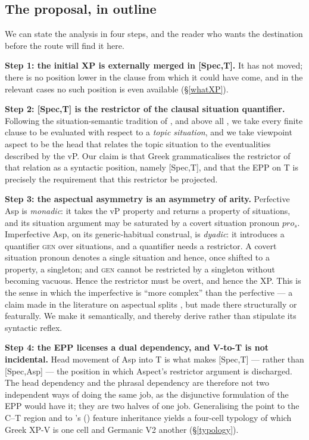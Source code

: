 \documentclass[11pt]{article}
\newcommand{\citeposs}[1]{\citeauthor{#1}'s (\citeyear{#1})}
\newcommand{\gen}{\textsc{gen}\xspace}
\newcommand{\prs}{\ensuremath{pro_{s}}\xspace}
\begin{document}
\subsection{The proposal, in outline}

We can state the analysis in four steps, and the reader who wants the destination before the route will find it here.

\medskip\noindent\textbf{Step 1: the initial XP is externally merged in [Spec,T].}  It has not moved; there is no position lower in the clause from which it could have come, and in the relevant cases no such position is even available (\S\ref{whatXP}).

\medskip\noindent\textbf{Step 2: [Spec,T] is the restrictor of the clausal situation quantifier.}  Following the situation-semantic tradition of \citet{austin-jl:1950a}, \citet{barwise-perry:1983} and above all \citet{kratzer:87, kratzer:19sep}, we take every finite clause to be evaluated with respect to a \emph{topic situation}, and we take viewpoint aspect to be the head that relates the topic situation to the eventualities described by the vP.  Our claim is that Greek grammaticalises the restrictor of that relation as a syntactic position, namely [Spec,T], and that the EPP on T is precisely the requirement that this restrictor be projected.

\medskip\noindent\textbf{Step 3: the aspectual asymmetry is an asymmetry of arity.}  Perfective Asp is \emph{monadic}: it takes the vP property and returns a property of situations, and its situation argument may be saturated by a covert situation pronoun \prs.  Imperfective Asp, on its generic-habitual construal, is \emph{dyadic}: it introduces a quantifier \gen over situations, and a quantifier needs a restrictor.  A covert situation pronoun denotes a single situation and hence, once shifted to a property, a singleton; and \gen cannot be restricted by a singleton without becoming vacuous.  Hence the restrictor must be overt, and hence the XP.  This is the sense in which the imperfective is ``more complex'' than the perfective --- a claim made in the literature on aspectual splits \citep{coon:13, laka:06, kalin-vanurk:15}, but made there structurally or featurally.  We make it semantically, and thereby derive rather than stipulate its syntactic reflex.

\medskip\noindent\textbf{Step 4: the EPP licenses a dual dependency, and V-to-T is not incidental.}  Head movement of Asp into T is what makes [Spec,T] --- rather than [Spec,Asp] --- the position in which Aspect's restrictor argument is discharged.  The head dependency and the phrasal dependency are therefore not two independent ways of doing the same job, as the disjunctive formulation of the EPP would have it; they are two halves of one job.  Generalising the point to the C--T region and to \citeposs{chomsky:08} feature inheritance yields a four-cell typology of which Greek XP-V is one cell and Germanic V2 another (\S\ref{typology}).
\end{document}

